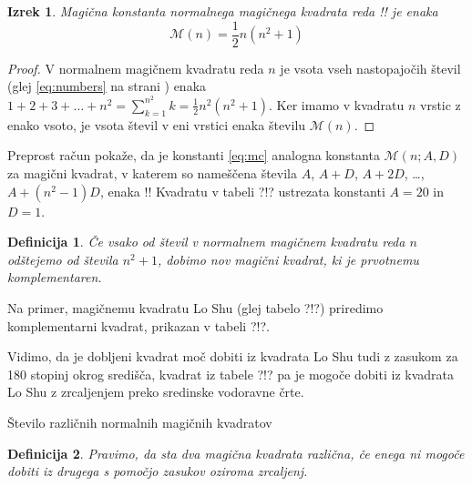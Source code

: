 \documentclass[a4paper,12pt]{article}
\newtheorem{definicija}{Definicija}
\newtheorem{izrek}{Izrek}
\newcommand{\m}{\mathcal{M}}
\begin{document}
   
   \begin{izrek}
      Magična konstanta normalnega magičnega kvadrata reda !!
      je enaka
      \begin{equation}
         \label{eq:mc}
         \m(n) = \frac{1}{2} n(n^2+1)
      \end{equation}
   \end{izrek}

   
   \begin{proof}
      V normalnem magičnem kvadratu reda $n$ je vsota vseh nastopajočih
      števil (glej \eqref{eq:numbers} na strani \pageref{eq:numbers}) enaka
      $1+2+3+\dots+n^2=\sum_{k=1}^{n^2}k=\frac{1}{2}n^2(n^2+1)$. Ker imamo
      v kvadratu $n$ vrstic z enako vsoto, je vsota števil v eni vrstici
      enaka številu $\m(n)$. %
   \end{proof}

Preprost račun pokaže, da je konstanti \eqref{eq:mc} analogna konstanta
$\m(n;A,D)$ za magični kvadrat, v katerem so nameščena števila
$A$, $A+D$, $A+2D$, \dots, $A+(n^2-1)D$, enaka %
!!
Kvadratu v tabeli ?!? ustrezata konstanti $A=20$ in $D=1$.

\begin{definicija}
      Če vsako od števil v normalnem magičnem kvadratu reda $n$ odštejemo
      od števila $n^2+1$, dobimo nov magični kvadrat, ki je prvotnemu
      \emph{komplementaren}.
\end{definicija}

Na primer, magičnemu kvadratu Lo Shu (glej tabelo ?!?) priredimo
komplementarni kvadrat, prikazan v tabeli ?!?.
%

Vidimo, da je dobljeni kvadrat moč dobiti iz kvadrata Lo Shu tudi z zasukom za
180 stopinj okrog središča, kvadrat iz tabele ?!? pa je mogoče dobiti
iz kvadrata Lo Shu z zrcaljenjem preko sredinske vodoravne črte.

Število različnih normalnih magičnih kvadratov

\begin{definicija}
      Pravimo, da sta dva magična kvadrata \emph{različna}, če enega ni mogoče dobiti
      iz drugega s pomočjo zasukov oziroma zrcaljenj.
\end{definicija}
\end{document}
